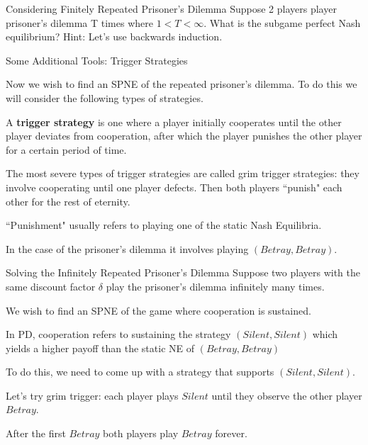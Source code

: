 \documentclass[aspectratio=169]{beamer}
\newenvironment{wideitemize}{\itemize\addtolength{\itemsep}{10pt}}{\enditemize}
\begin{document}
\begin{frame}{Considering Finitely Repeated Prisoner's Dilemma}
    Suppose 2 players player prisoner's dilemma T times where $1<T<\infty$. What is the subgame perfect Nash equilibrium? Hint: Let's use backwards induction.
\end{frame}
\begin{frame}{Some Additional Tools: Trigger Strategies}

\begin{wideitemize}
    \item Now we wish to find an SPNE of the repeated prisoner's dilemma. To do this we will consider the following types of strategies.
    
    \begin{definition}
A \textbf{trigger strategy} is one where a player initially cooperates until the other player deviates from cooperation, after which the player punishes the other player for a certain period of time.
\end{definition}

\item The most severe types of trigger strategies are called grim trigger strategies: they involve cooperating until one player defects. Then both players ``punish" each other for the rest of eternity.

\item ``Punishment" usually refers to playing one of the static Nash Equilibria.
\item In the case of the prisoner's dilemma it involves playing $(Betray, Betray)$.

\end{wideitemize}

\end{frame}

\begin{frame}{Solving the Infinitely Repeated Prisoner's Dilemma}
Suppose two players with the same discount factor $\delta$ play the prisoner's dilemma infinitely many times.
\begin{wideitemize}
    \item We wish to find an SPNE of the game where cooperation is sustained.
    \item In PD, cooperation refers to sustaining the strategy $(Silent, Silent)$ which yields a higher payoff than the static NE of $(Betray, Betray)$
    \item To do this, we need to come up with a strategy that supports $(Silent, Silent)$.
    \item Let's try grim trigger: each player plays $Silent$ until they observe the other player $Betray$.
    \item After the first $Betray$ both players play $Betray$ forever.
\end{wideitemize}
    
\end{frame}
\end{document}
